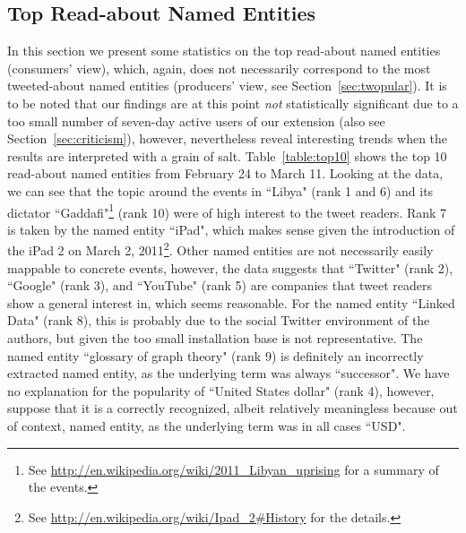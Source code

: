\documentclass[runningheads,a4paper]{llncs}
\begin{document}
\subsection{Top Read-about Named Entities}
In this section we present some statistics on the top read-about named entities (consumers' view), which, again, does not necessarily correspond to the most tweeted-about named entities (producers' view, see Section~\ref{sec:twopular}). It is to be noted that our findings are at this point \textit{not} statistically significant due to a too small number of seven-day active users of our extension (also see Section~\ref{sec:criticism}), however, nevertheless reveal interesting trends when the results are interpreted with a grain of salt. Table~\ref{table:top10} shows the top 10 read-about named entities from February 24 to March 11. Looking at the data, we can see that the topic around the events in ``Libya" (rank 1 and 6) and its dictator ``Gaddafi"\footnote{See \url{http://en.wikipedia.org/wiki/2011_Libyan_uprising} for a summary of the events.} (rank 10) were of high interest to the tweet readers. Rank 7 is taken by the named entity ``iPad", which makes sense given the introduction of the iPad 2 on March 2, 2011\footnote{See \url{http://en.wikipedia.org/wiki/Ipad_2#History} for the details.}. Other named entities are not necessarily easily mappable to concrete events, however, the data suggests that ``Twitter" (rank 2), ``Google" (rank 3), and ``YouTube" (rank 5) are companies that tweet readers show a general interest in, which seems reasonable. For the named entity ``Linked Data" (rank 8), this is probably due to the social Twitter environment of the authors, but given the too small installation base is not representative. The named entity ``glossary of graph theory" (rank 9) is definitely an incorrectly extracted named entity, as the underlying term was always ``successor". We have no explanation for the popularity of ``United States dollar" (rank 4), however, suppose that it is a correctly recognized, albeit relatively meaningless because out of context, named entity, as the underlying term was in all cases ``USD".
\end{document}
